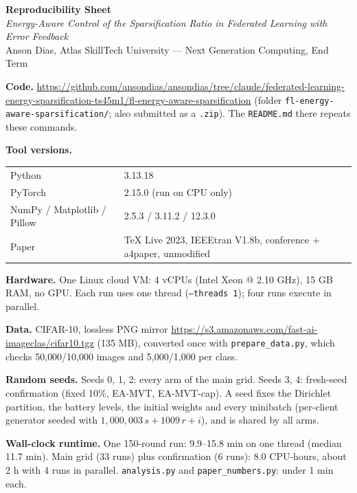 \documentclass[10pt,a4paper]{article}
\begin{document}
{\large\bfseries Reproducibility Sheet}\\[2pt]
\emph{Energy-Aware Control of the Sparsification Ratio in Federated Learning with Error Feedback}\\
Anson Dias, Atlas SkillTech University --- Next Generation Computing, End Term

\textbf{Code.} \url{https://github.com/ansondias/ansondias/tree/claude/federated-learning-energy-sparsification-ts45m1/fl-energy-aware-sparsification}
(folder \texttt{fl-energy-aware-sparsification/}; also submitted as a \texttt{.zip}). The \texttt{README.md} there repeats these commands.

\textbf{Tool versions.}\par\noindent
\begin{tabular}{@{}ll@{}}
Python & 3.13.18\\
PyTorch & 2.15.0 (run on CPU only)\\
NumPy / Matplotlib / Pillow & 2.5.3 / 3.11.2 / 12.3.0\\
Paper & TeX Live 2023, IEEEtran V1.8b, conference + a4paper, unmodified\\
\end{tabular}

\textbf{Hardware.} One Linux cloud VM: 4 vCPUs (Intel Xeon @ 2.10 GHz), 15 GB RAM, no GPU. Each run uses one thread (\texttt{--threads 1}); four runs execute in parallel.

\textbf{Data.} CIFAR-10, lossless PNG mirror \url{https://s3.amazonaws.com/fast-ai-imageclas/cifar10.tgz} (135 MB), converted once with \texttt{prepare\_data.py}, which checks 50{,}000/10{,}000 images and 5{,}000/1{,}000 per class.

\textbf{Random seeds.} Seeds 0, 1, 2: every arm of the main grid. Seeds 3, 4: fresh-seed confirmation (fixed 10\%, EA-MVT, EA-MVT-cap). A seed fixes the Dirichlet partition, the battery levels, the initial weights and every minibatch (per-client generator seeded with $1{,}000{,}003\,s+1009\,r+i$), and is shared by all arms.

\textbf{Wall-clock runtime.} One 150-round run: 9.9--15.8 min on one thread (median 11.7 min). Main grid (33 runs) plus confirmation (6 runs): 8.0 CPU-hours, about 2 h with 4 runs in parallel. \texttt{analysis.py} and \texttt{paper\_numbers.py}: under 1 min each.
\end{document}
